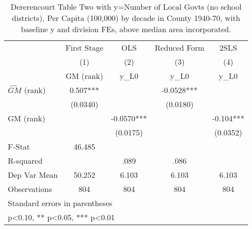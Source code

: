 \begin{table}[htbp]\centering
\def\sym#1{\ifmmode^{#1}\else\(^{#1}\)\fi}
\caption{Dererencourt Table Two with y=Number of Local Govts (no school districts), Per Capita (100,000) by decade in County 1940-70, with baseline y and division FEs, above median area incorporated.}
\begin{tabular}{l*{4}{c}}
\toprule
                    & First Stage   &         OLS   &Reduced Form   &        2SLS   \\
                    &\multicolumn{1}{c}{(1)}&\multicolumn{1}{c}{(2)}&\multicolumn{1}{c}{(3)}&\multicolumn{1}{c}{(4)}\\
                    &\multicolumn{1}{c}{GM  (rank)}&\multicolumn{1}{c}{y\_L0}&\multicolumn{1}{c}{y\_L0}&\multicolumn{1}{c}{y\_L0}\\
\midrule
$\hat{GM}$ (rank)   &       0.507***&               &     -0.0528***&               \\
                    &    (0.0340)   &               &    (0.0180)   &               \\
\addlinespace
GM  (rank)          &               &     -0.0570***&               &      -0.104***\\
                    &               &    (0.0175)   &               &    (0.0352)   \\
\midrule
F-Stat              &      46.485   &               &               &               \\
R-squared           &               &        .089   &        .086   &               \\
Dep Var Mean        &      50.252   &       6.103   &       6.103   &       6.103   \\
Observations        &         804   &         804   &         804   &         804   \\
\bottomrule
\multicolumn{5}{l}{\footnotesize Standard errors in parentheses}\\
\multicolumn{5}{l}{\footnotesize * p<0.10, ** p<0.05, *** p<0.01}\\
\end{tabular}
\end{table}
